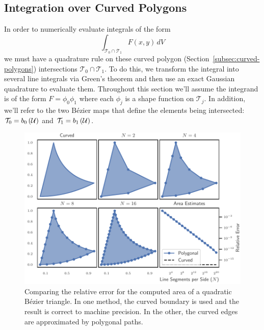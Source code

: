 \subsection{Integration over Curved Polygons}
\label{subsec:integration-on-curved}

In order to numerically evaluate integrals of the form
\begin{equation}
\int_{\mathcal{T}_0 \cap \mathcal{T}_1} F(x, y) \, dV
\end{equation}
we must have a quadrature rule on these curved polygon
(Section~\ref{subsec:curved-polygons}) intersections
\(\mathcal{T}_0 \cap \mathcal{T}_1\).
To do this, we transform the integral into several line integrals
via Green's theorem and then use an exact Gaussian quadrature to
evaluate them. Throughout this section we'll assume the integrand
is of the form \(F = \phi_0 \phi_1\) where each \(\phi_j\) is a shape
function on \(\mathcal{T}_j\). In addition, we'll refer to the two
B\'{e}zier maps that define the elements being intersected:
\(\mathcal{T}_0 = b_0\left(\mathcal{U}\right)\) and
\(\mathcal{T}_1 = b_1\left(\mathcal{U}\right)\).

\begin{figure}
  \includegraphics{../images/solution-transfer/polygon_vs_curved.pdf}
  \centering
  \captionsetup{width=.75\linewidth}
  \caption{Comparing the relative error for the computed area of a quadratic
    B\'{e}zier triangle. In one method, the curved boundary is used and the
    result is correct to machine precision. In the other, the curved edges
    are approximated by polygonal paths.}
  \label{fig:polygon-vs-curved}
\end{figure}

